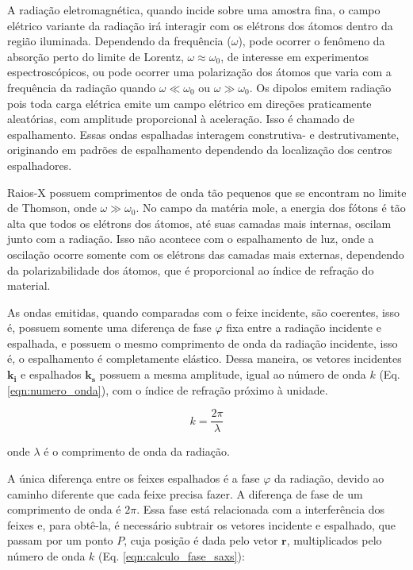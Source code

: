 		A radiação eletromagnética, quando incide sobre uma amostra fina, o campo elétrico variante da radiação irá interagir com os elétrons dos átomos dentro da região iluminada. Dependendo da frequência (\(\omega\)), pode ocorrer o fenômeno da absorção perto do limite de Lorentz, \(\omega \approx \omega_0\), de interesse em experimentos espectroscópicos, ou pode ocorrer uma polarização dos átomos que varia com a frequência da radiação quando \(\omega \ll \omega_0\) ou \(\omega \gg \omega_0\). Os dipolos emitem radiação pois toda carga elétrica emite um campo elétrico em direções praticamente aleatórias, com amplitude proporcional à aceleração. Isso é chamado de espalhamento. Essas ondas espalhadas interagem construtiva- e destrutivamente, originando em padrões de espalhamento dependendo da localização dos centros espalhadores.
		
		Raios-X possuem comprimentos de onda tão pequenos que se encontram no limite de Thomson, onde \(\omega \gg \omega_0\). No campo da matéria mole, a energia dos fótons é tão alta que todos os elétrons dos átomos, até suas camadas mais internas, oscilam junto com a radiação. Isso não acontece com o espalhamento de luz, onde a oscilação ocorre somente com os elétrons das camadas mais externas, dependendo da polarizabilidade dos átomos, que é proporcional ao índice de refração do material. %
		
		As ondas emitidas, quando comparadas com o feixe incidente, são coerentes, isso é, possuem somente uma diferença de fase \(\varphi\) fixa entre a radiação incidente e espalhada, e possuem o mesmo comprimento de onda da radiação incidente, isso é, o espalhamento é completamente elástico. Dessa maneira, os vetores incidentes \(\mathbf{k_i}\) e espalhados \(\mathbf{k_s}\) possuem a mesma amplitude, igual ao número de onda \(k\) (Eq. \ref{eqn:numero_onda}), com o índice de refração próximo à unidade.
		
		\begin{equation} 
			k = \dfrac{2 \pi}{\lambda}
			\label{eqn:numero_onda}
		\end{equation} 
		
		\noindent onde \(\lambda\) é o comprimento de onda da radiação.
		
		A única diferença entre os feixes espalhados é a fase \(\varphi\) da radiação, devido ao caminho diferente que cada feixe precisa fazer. A diferença de fase de um comprimento de onda é \(2\pi\). Essa fase está relacionada com a interferência dos feixes e, para obtê-la, é necessário subtrair os vetores incidente e espalhado, que passam por um ponto \(P\), cuja posição é dada pelo vetor \(\mathbf{r}\), multiplicados pelo número de onda \(k\) (Eq. \ref{eqn:calculo_fase_saxs}):
		
